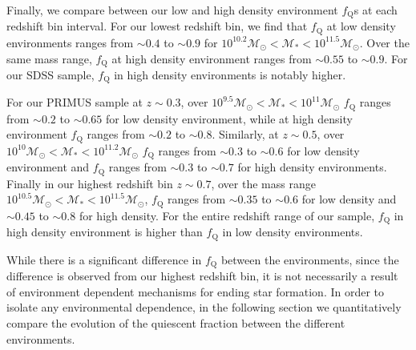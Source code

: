 \documentclass{emulateapj}
\begin{document}

Finally, we compare between our low and high density environment
$f_{\mathrm{Q}}$s at each redshift bin interval. For our lowest redshift
bin, we find that $f_{\mathrm{Q}}$ at low density environments ranges from
$\sim 0.4$ to $\sim 0.9$ for $10^{10.2} \mathcal{M}_{\odot} <
\mathcal{M}_{*} < 10^{11.5} \mathcal{M}_{\odot}$. Over the same mass
range, $f_{\mathrm{Q}}$ at high density environment ranges from $\sim
0.55$ to $\sim 0.9$. For our SDSS sample, $f_{\mathrm{Q}}$ in
high density environments is notably higher. 

For our PRIMUS sample at $z \sim 0.3$, over $10^{9.5} \mathcal{M}_{\odot} < \mathcal{M}_{*} < 10^{11} \mathcal{M}_{\odot}$ $f_{\mathrm{Q}}$ ranges from $\sim 0.2$ to $\sim 0.65$ for low density environment, while at high density environment $f_{\mathrm{Q}}$ ranges from $\sim 0.2$ to $\sim 0.8$. Similarly, at $z \sim 0.5$, over $10^{10} \mathcal{M}_{\odot} < \mathcal{M}_{*} < 10^{11.2} \mathcal{M}_{\odot}$ $f_{\mathrm{Q}}$ ranges from $\sim 0.3$ to $\sim 0.6$ for low density environment and $f_{\mathrm{Q}}$ ranges from $\sim 0.3$ to $\sim 0.7$ for high density environments. Finally in our highest redshift bin $z \sim 0.7$, over the mass range $10^{10.5} \mathcal{M}_{\odot} < \mathcal{M}_{*} < 10^{11.5} \mathcal{M}_{\odot}$, $f_{\mathrm{Q}}$ ranges from $\sim 0.35$ to $\sim 0.6$ for low density and $\sim 0.45$ to $\sim 0.8$ for high density. For the entire redshift range of our sample, $f_{\mathrm{Q}}$ in high density environment is higher than $f_{\mathrm{Q}}$ in low density environments. 

While there is a significant difference in $f_{\mathrm{Q}}$ between the
environments, since the difference is observed from our highest
redshift bin, it is not necessarily a result of environment dependent
mechanisms for ending star formation. In order to isolate any
environmental dependence, in the following section we quantitatively
compare the evolution of the quiescent fraction between the different
environments.
\end{document}
